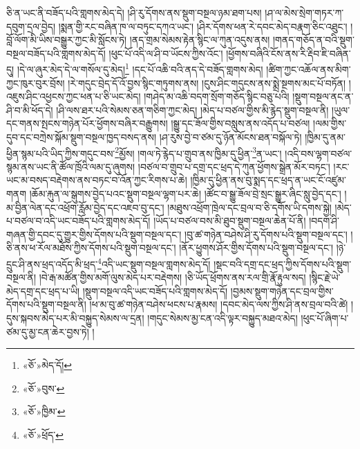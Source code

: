 ཅི་ན་ཡང་ནི་བཟོད་པའི་གླགས་མེད་དེ། །ཤི་རུ་དོགས་ནས་སྡུག་བསྔལ་ཉམ་ཐག་པས། །ཤ་ལ་མེས་སྲེག་གཏར་ཀ་དབུག་དྲལ་བྱེད། །སྨན་གྱི་རང་བཞིན་ཁ་ལ་བཏུང་དཀའ་ཡང་། །ཤིར་དོགས་ཕན་རེ་དབང་མེད་བརྣག་ཅིང་འཐུང་། །བློ་ལོག་མི་ཡིས་བསྒྱུར་ཀྱང་མི་སློངས་ཏེ། །ནད་གྲམ་སེམས་རྟེན་སྙིང་ལ་ཀུན་འདུས་ནས། །གནད་གཅོད་ན་བའི་སྡུག་བསྔལ་བཟོད་པའི་གླགས་མེད་དོ། །ཕུང་པོ་འདི་ལ་ཤི་བ་ཡོངས་ཀྱིས་འོང་། །ཕྱོགས་བཞིའི་ངོས་ནས་རི་རྡིབ་ཇི་བཞིན་དུ། །དེ་ལ་ཞུར་མེད་དེ་ལ་གསོལ་དུ་མེད།\footnote{«ཅོ་»མེད་དོ།} །དང་པོ་འཆི་བའི་ནད་དེ་བཟོད་གླགས་མེད། །ཚིག་ཀྱང་འཆོལ་ནས་མིག་ཀྱང་ཁུར་བུར་བྲོས། །རེ་གདུང་བྲེད་དོ་འོ་བྱས་སྙིང་གཏུགས་ནས། །ངུས་ཤིང་གདུངས་ནས་སྨྲེ་སྔགས་མང་པོ་བཏོན། །འཇུས་ཤིང་འཕྱངས་ཀྱང་ཕན་པ་ཅི་ཡང་མེད། །གཤེད་མ་འཆི་བདག་སྲོག་གཅོད་སྙིང་བཅུ་པའི། །སྡུག་བསྔལ་ནང་ན་ཤི་བ་མི་ཕོད་དེ། །ཤི་ལས་ཐར་པའི་སེམས་ཅན་གཅིག་ཀྱང་མེད། །མེད་པ་བཙལ་གྱིས་མི་རྙེད་སྡུག་བསྔལ་ནི། །ཡུལ་དང་གནས་སྤངས་གཉེན་པོར་ཕྱོགས་བཞིར་བརྒྱུགས། །སྒྱུ་དང་ཟོལ་གྱིས་བསླུས་ནས་འདོད་པ་བཙལ། །ལམ་གྱིས་དུབ་དང་བཀྲེས་སྐོམ་སྡུག་བསྔལ་ཁྱད་བསད་ནས། །ཤ་རུས་བྱེ་བ་ཙམ་དུ་ཉོན་མོངས་ཐན་བསྐོལ་ཏེ། །ཁྱིམ་དུ་ནམ་ཕྱིན་སྙམ་པའི་ཡིད་ཀྱིས་གདུང་བས་\footnote{«ཅོ་»བུས་}མྱོས། །གལ་ཏེ་རྙེད་པ་གྲུབ་ནས་ཁྱིམ་དུ་ཕྱིན་\footnote{«ཅོ་»ཁྱིམ་}ན་ཡང་། །འདི་བས་ལྷག་བཙལ་སྙམ་ནས་ཡང་ནི་ཚོལ་ཁྲོའི་ལམ་དུ་ཞུགས། །བཙལ་བ་གྲུབ་པ་དགྲ་དང་ཕྲད་དེ་ཀུན་ཕྱོགས་སྒྲེན་མོར་བཏང་། །རང་ཡང་མ་བསད་བརྡེགས་ནས་བཏང་བ་འོན་ཀྱང་རིགས་པ་ཆེ། །ཁྱིམ་དུ་ཕྱིན་ནས་བུ་སྨད་དང་ཕྲད་ན་ཡང་ངོ་འཛུམ་གནག །ཆོམ་རྐུན་ལ་སྒུགས་བྱེད་པའང་སྡུག་བསྔལ་ལྷག་པར་ཆེ། །ཚོང་བ་སྒྱུ་ཟོལ་བྲེ་སྲང་སྒྱུར་ཞིང་སླུ་བྱེད་དང་། །མ་བྱིན་ལེན་དང་འཕྲོག་རློམ་བྱེད་དང་འཇབ་བུ་དང་། །མཐུས་འཕྲོག་ཁྲེལ་དང་བྲལ་བ་ཅི་དགོས་ཡི་དགས་སྐྱེ། །མེད་པ་བཙལ་བ་འདི་ཡང་བཟོད་པའི་གླགས་མེད་དོ། །ཡོད་པ་བཙལ་བས་མི་ཐུབ་སྡུག་བསྔལ་ཆེན་པོ་ནི། །བདག་ཤི་གཞན་གྱི་དབང་དུ་གྱུར་གྱིས་དོགས་པའི་སྡུག་བསྔལ་དང་། །བུ་ཚ་གཉེན་བཤེས་ཤི་རུ་དོགས་པའི་སྡུག་བསྔལ་དང་། །ཅི་ནས་ཕ་རོལ་མཐོས་ཀྱིས་དོགས་པའི་སྡུག་བསྔལ་དང་། །ནོར་ཕྱུགས་ཤོར་གྱིས་དོགས་པའི་སྡུག་བསྔལ་དང་། །ཉེ་དྲུང་ཤི་ནས་ཕྲད་འདོད་མི་ཕྲད་\footnote{«ཅོ་»ཕྲོད་}འདི་ཡང་སྡུག་བསྔལ་གླགས་མེད་དོ། །སྡང་བའི་དགྲ་དང་ཕྲད་ཀྱིས་དོགས་པའི་སྡུག་བསྔལ་ནི། །བེ་རྒ་མཚོན་གྱིས་མགོ་ལུས་མེད་པར་བརྡེགས། །ཅི་ཡོད་ཕྲོགས་ནས་རལ་གྲི་རྣོ་རྟུལ་སད། །སྙིང་རྗེ་ཡེ་མེད་དགྲ་དང་ཕྲད་པ་ཡི། །སྡུག་བསྔལ་འདི་ཡང་བཟོད་པའི་གླགས་མེད་དོ། །བྱམས་སྡུག་གཉེན་དང་བྲལ་གྱིས་དོགས་པའི་སྡུག་བསྔལ་ནི། །ཕ་མ་བུ་ཚ་གཉེན་བཤེས་ཕངས་པ་རྣམས། །དབང་མེད་ལས་ཀྱིས་ཤི་ནས་བྲལ་བའི་ཚེ། །དུས་སྐབས་མེད་པར་མི་བསྐྱུད་སེམས་ལ་དྲན། །གདུང་སེམས་མྱ་ངན་འདི་ལྟར་བསྐྱུད་མཐའ་མེད། །ཕུང་པོ་ཞིག་པ་ཙམ་དུ་མྱ་ངན་ཆེར་བྱས་ཏེ། །
